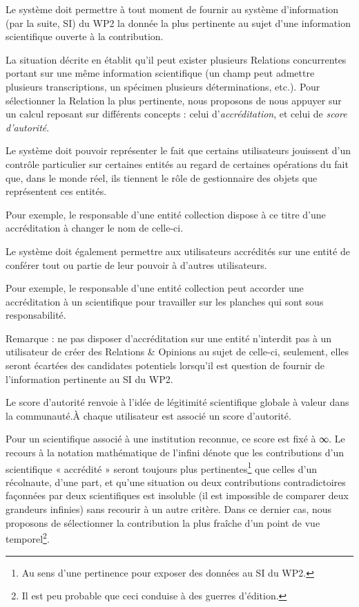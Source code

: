 \fon{} Le système doit permettre à tout moment de fournir au système d'information (par la suite, SI) du WP2 la donnée la plus pertinente au sujet d'une information scientifique ouverte à la contribution.

La situation décrite en \in[s:relopi] établit qu'il peut exister plusieurs Relations concurrentes portant sur une même information scientifique (un champ peut admettre plusieurs transcriptions, un spécimen plusieurs déterminations, etc.).
Pour sélectionner la Relation la plus pertinente, nous proposons de nous appuyer sur un calcul reposant sur différents concepts : celui d'{\em accréditation}, et celui de {\em score d'autorité}.

\startsubsection[title={Notion d'accréditation}]

\fon{} Le système doit pouvoir représenter le fait que certains utilisateurs jouissent d'un contrôle particulier sur certaines entités au regard de certaines opérations du fait que, dans le monde réel, ils tiennent le rôle de gestionnaire des objets que représentent ces entités.

Pour exemple, le responsable d'une entité collection dispose à ce titre d'une accréditation à changer le nom de celle-ci.

\bigskip

\fon{} Le système doit également permettre aux utilisateurs accrédités sur une entité de conférer tout ou partie de leur pouvoir à d'autres utilisateurs.

Pour exemple, le responsable d'une entité collection peut accorder une accréditation à un scientifique pour travailler sur les planches qui sont sous responsabilité.

\bigskip

Remarque : ne pas disposer d'accréditation sur une entité n'interdit pas à un utilisateur de créer des Relations & Opinions au sujet de celle-ci, seulement, elles seront écartées des candidates potentiels lorsqu'il est question de fournir de l'information pertinente au SI du WP2.

\startsubsection[title={Notion de score d'autorité}] %

\fon{} Le score d'autorité renvoie à l'idée de légitimité scientifique globale à valeur dans la communauté.À chaque utilisateur est associé un score d'autorité.

\leafa{} Pour un scientifique associé à une institution reconnue, ce score est fixé à ∞.
Le recours à la notation mathématique de l'infini dénote que les contributions d'un scientifique « accrédité » seront toujours plus pertinentes\footnote{Au sens d'une pertinence pour exposer des données au SI du WP2.} que celles d'un récolnaute, d'une part, et qu'une situation ou deux contributions contradictoires façonnées par deux scientifiques est insoluble (il est impossible de comparer deux grandeurs infinies) sans recourir à un autre critère.
Dans ce dernier cas, nous proposons de sélectionner la contribution la plus fraîche d'un point de vue temporel\footnote{Il est peu probable que ceci conduise à des guerres d'édition.}.

